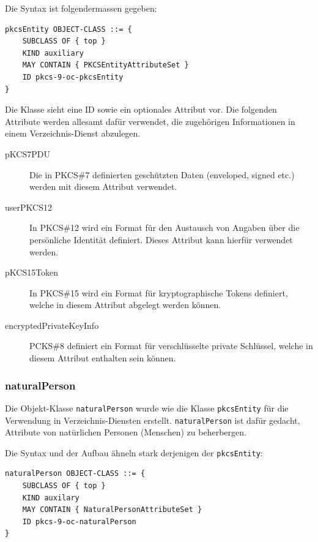 \documentclass[10pt,a4paper]{article}
\begin{document}
Die Syntax ist folgendermassen gegeben: 
\begin{verbatim}
pkcsEntity OBJECT-CLASS ::= {
    SUBCLASS OF { top }
    KIND auxiliary
    MAY CONTAIN { PKCSEntityAttributeSet }
    ID pkcs-9-oc-pkcsEntity
}
\end{verbatim}

Die Klasse sieht eine ID sowie ein optionales Attribut vor. Die folgenden Attribute werden
allesamt dafür verwendet, die zugehörigen Informationen in einem Verzeichnis-Dienst
abzulegen.
\begin{description}
    \item[pKCS7PDU] Die in PKCS\#7 definierten geschützten Daten (enveloped, signed etc.)
        werden mit diesem Attribut verwendet.
    \item[userPKCS12] In PKCS\#12 wird ein Format für den Austausch von Angaben über die
        persönliche Identität definiert. Dieses Attribut kann hierfür verwendet werden.
    \item[pKCS15Token] In PKCS\#15 wird ein Format für kryptographische Tokens definiert,
        welche in diesem Attribut abgelegt werden können.
    \item[encryptedPrivateKeyInfo] PCKS\#8 definiert ein Format für verschlüsselte private
        Schlüssel, welche in diesem Attribut enthalten sein können.
\end{description}

\subsubsection{naturalPerson}
Die Objekt-Klasse \texttt{naturalPerson} wurde wie die Klasse \texttt{pkcsEntity} für die
Verwendung in Verzeichnis-Diensten erstellt. \texttt{naturalPerson} ist dafür gedacht,
Attribute von natürlichen Personen (Menschen) zu beherbergen.

Die Syntax und der Aufbau ähneln stark derjenigen der \texttt{pkcsEntity}:
\begin{verbatim}
naturalPerson OBJECT-CLASS ::= {
    SUBCLASS OF { top }
    KIND auxilary
    MAY CONTAIN { NaturalPersonAttributeSet }
    ID pkcs-9-oc-naturalPerson
}
\end{verbatim}
\end{document}
